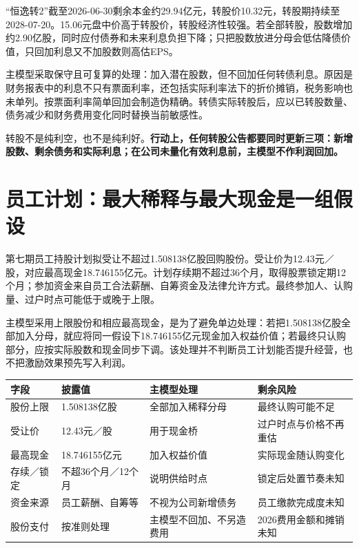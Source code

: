 “恒逸转2”截至2026-06-30剩余本金约29.94亿元，转股价10.32元，转股期持续至2028-07-20。15.06元盘中价高于转股价，转股经济性较强。若全部转股，股数增加约2.90亿股，同时应付债券和未来利息负担下降；只把股数放进分母会低估降债价值，只回加利息又不加股数则高估EPS。

主模型采取保守且可复算的处理：加入潜在股数，但不回加任何转债利息。原因是财务报表中的利息不只有票面利率，还包括实际利率法下的折价摊销，税务影响也未单列。按票面利率简单回加会制造伪精确。转债实际转股后，应以已转股数量、债务减少和财务费用变化同时替换当前敏感性。

\begin{keyinsight}
转股不是纯利空，也不是纯利好。\textbf{行动上，任何转股公告都要同时更新三项：新增股数、剩余债务和实际利息；在公司未量化有效利息前，主模型不作利润回加。}
\end{keyinsight}

\section{员工计划：最大稀释与最大现金是一组假设}

{\sloppy 第七期员工持股计划拟受让不超过1.508138亿股回购股份。受让价为12.43元／股，对应最高现金18.746155亿元。计划存续期不超过36个月，取得股票锁定期12个月；参加资金来自员工合法薪酬、自筹资金及法律允许方式。最终参加人、认购量、过户时点可能低于或晚于上限。\par}

主模型采用上限股份和相应最高现金，是为了避免单边处理：若把1.508138亿股全部加入分母，就应将同一假设下18.746155亿元现金加入权益价值；若最终只认购部分，应按实际股数和现金同步下调。该处理并不判断员工计划能否提升经营，也不把激励效果预先写入利润。

\begin{exhibitbox}[第七期员工计划的估值与会计边界]
\noindent\begin{tabularx}{\textwidth}{L{3.45cm}L{2.45cm}L{2.8cm}X}
\toprule
\textbf{字段} & \textbf{披露值} & \textbf{主模型处理} & \textbf{剩余风险} \\
\midrule
股份上限 & 1.508138亿股 & 全部加入稀释分母 & 最终认购可能不足 \\
受让价 & 12.43元／股 & 用于现金桥 & 过户时点与价格不再重估 \\
最高现金 & 18.746155亿元 & 加入权益价值 & 实际现金随认购变化 \\
存续／锁定 & 不超36个月／12个月 & 说明供给时点 & 锁定后处置节奏未知 \\
资金来源 & 员工薪酬、自筹等 & 不视为公司新增债务 & 员工缴款完成度未知 \\
股份支付 & 按准则处理 & 主模型不回加、不另造费用 & 2026费用金额和摊销未知 \\
\bottomrule
\end{tabularx}
\end{exhibitbox}

